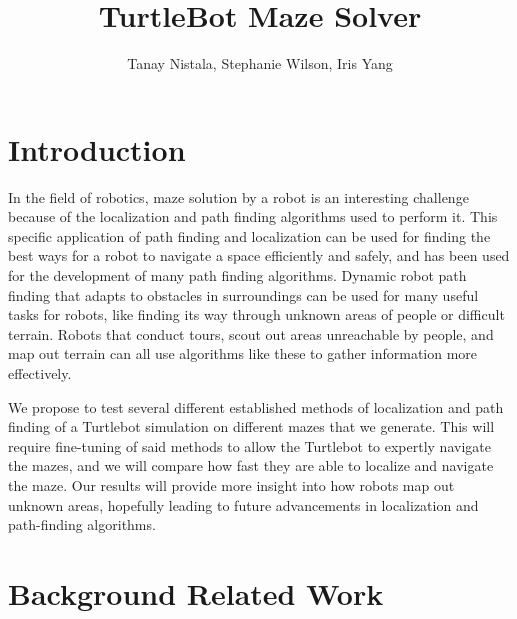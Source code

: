 \documentclass{article}
\title{TurtleBot Maze Solver}
\author{Tanay Nistala, Stephanie Wilson, Iris Yang}
\date{\vspace{-1em}}
\begin{document}
\maketitle


\section{Introduction}


In the field of robotics, maze solution by a robot is an interesting challenge because of the localization and path finding algorithms used to perform it. This specific application of path finding and localization can be used for finding the best ways for a robot to navigate a space efficiently and safely, and has been used for the development of many path finding algorithms. Dynamic robot path finding that adapts to obstacles in surroundings can be used for many useful tasks for robots, like finding its way through unknown areas of people or difficult terrain. Robots that conduct tours, scout out areas unreachable by people, and map out terrain can all use algorithms like these to gather information more effectively. 


We propose to test several different established methods of localization and path finding of a Turtlebot simulation on different mazes that we generate. This will require fine-tuning of said methods to allow the Turtlebot to expertly navigate the mazes, and we will compare how fast they are able to localize and navigate the maze. Our results will provide more insight into how robots map out unknown areas, hopefully leading to future advancements in localization and path-finding algorithms. 



\section{Background Related Work}
\end{document}
